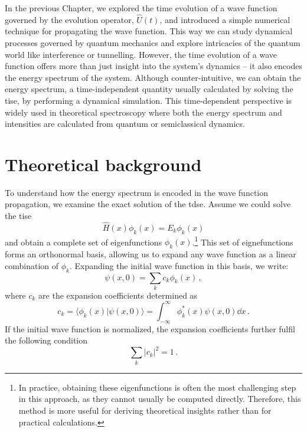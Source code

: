 In the previous Chapter, we explored the time evolution of a wave function governed by the evolution operator, $\hat{U}(t)$, and introduced a simple numerical technique for propagating the wave function. This way we can study dynamical processes governed by quantum mechanics and explore intricacies of the quantum world like interference or tunnelling. However, the time evolution of a wave function offers more than just insight into the system's dynamics -- it also encodes the energy spectrum of the system. Although counter-intuitive, we can obtain the energy spectrum, a time-independent quantity usually calculated by solving the \acrfull{tise}, by performing a dynamical simulation. This time-dependent perspective is widely used in theoretical spectroscopy where both the energy spectrum and intensities are calculated from quantum or semiclassical dynamics.

\section{Theoretical background}
\label{sec:autocorrintro}

To understand how the energy spectrum is encoded in the wave function propagation, we examine the exact solution of the \acrlong{tdse}. Assume we could solve the \acrshort{tise}
\begin{equation}
    \hat{H}(x) \phi_k(x) = E_k \phi_k(x)
    \label{eq:tise0}
\end{equation}
and obtain a complete set of eigenfunctions $\phi_k(x)$.\footnote{In practice, obtaining these eigenfunctions is often the most challenging step in this approach, as they cannot usually be computed directly. Therefore, this method is more useful for deriving theoretical insights rather than for practical calculations.} This set of eignefunctions forms an orthonormal basis, allowing us to expand any wave function as a linear combination of $\phi_k$. Expanding the initial wave function in this basis, we write:
\begin{equation}
    \psi(x,0) = \sum_k c_k \phi_k(x) \, ,
\end{equation}
where $c_k$ are the expansion coefficients determined as 
\begin{equation}
    c_k = \langle \phi_k(x) | \psi(x,0) \rangle = \int_{-\infty}^\infty \phi_k^*(x) \psi(x,0) \dd x \, .
    \label{eq:psi0v1}
\end{equation}
If the initial wave function is normalized, the expansion coefficients further fulfil the following condition
\begin{equation}
    \sum_k |c_k|^2 = 1 \, .
    \label{eq:initcoeffs}
\end{equation}

